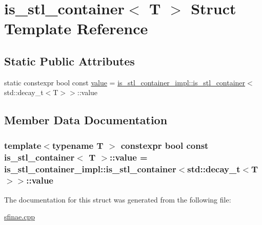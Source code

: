 \hypertarget{structis__stl__container}{}\section{is\+\_\+stl\+\_\+container$<$ T $>$ Struct Template Reference}
\label{structis__stl__container}
\subsection*{Static Public Attributes}
\begin{DoxyCompactItemize}
\item 
static constexpr bool const \hyperlink{structis__stl__container_acf9b40134725ccd2b0b08d17917ed2fd}{value} = \hyperlink{structis__stl__container__impl_1_1is__stl__container}{is\+\_\+stl\+\_\+container\+\_\+impl\+::is\+\_\+stl\+\_\+container}$<$std\+::decay\+\_\+t$<$T$>$$>$\+::value
\end{DoxyCompactItemize}


\subsection{Member Data Documentation}
\subsubsection[{\texorpdfstring{value}{value}}]{\setlength{\rightskip}{0pt plus 5cm}template$<$typename T $>$ constexpr bool const {\bf is\+\_\+stl\+\_\+container}$<$ T $>$\+::value = {\bf is\+\_\+stl\+\_\+container\+\_\+impl\+::is\+\_\+stl\+\_\+container}$<$std\+::decay\+\_\+t$<$T$>$$>$\+::value\hspace{0.3cm}{\ttfamily [static]}}\hypertarget{structis__stl__container_acf9b40134725ccd2b0b08d17917ed2fd}{}\label{structis__stl__container_acf9b40134725ccd2b0b08d17917ed2fd}


The documentation for this struct was generated from the following file\+:\begin{DoxyCompactItemize}
\item 
\hyperlink{sfinae_8cpp}{sfinae.\+cpp}\end{DoxyCompactItemize}
